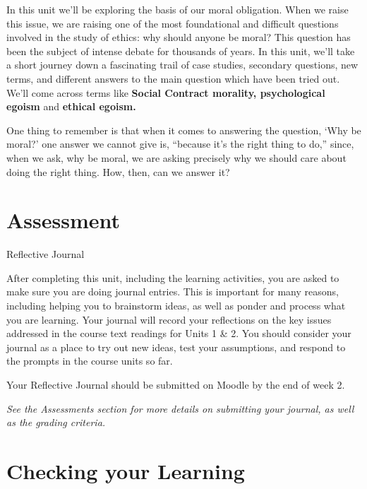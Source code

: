 \documentclass[
]{book}
\begin{document}
In this unit we'll be exploring the basis of our moral obligation. When we raise this issue, we are raising one of the most foundational and difficult questions involved in the study of ethics: why should anyone be moral? This question has been the subject of intense debate for thousands of years. In this unit, we'll take a short journey down a fascinating trail of case studies, secondary questions, new terms, and different answers to the main question which have been tried out. We'll come across terms like \textbf{Social Contract morality, psychological egoism} and \textbf{ethical egoism.}

One thing to remember is that when it comes to answering the question, `Why be moral?' one answer we cannot give is, ``because it's the right thing to do,'' since, when we ask, why be moral, we are asking precisely why we should care about doing the right thing. How, then, can we answer it?

\hypertarget{assessment-3}{%
\section*{Assessment}\label{assessment-3}}

\begin{assessment}
{Reflective Journal }

After completing this unit, including the learning activities, you are asked to make sure you are doing journal entries. This is important for many reasons, including helping you to brainstorm ideas, as well as ponder and process what you are learning. Your journal will record your reflections on the key issues addressed in the course text readings for Units 1 \& 2. You should consider your journal as a place to try out new ideas, test your assumptions, and respond to the prompts in the course units so far.

Your Reflective Journal should be submitted on Moodle by the end of week 2.

\emph{See the Assessments section for more details on submitting your journal, as well as the grading criteria.}
\end{assessment}

\hypertarget{checking-your-learning-1}{%
\section*{Checking your Learning}\label{checking-your-learning-1}}
\end{document}
